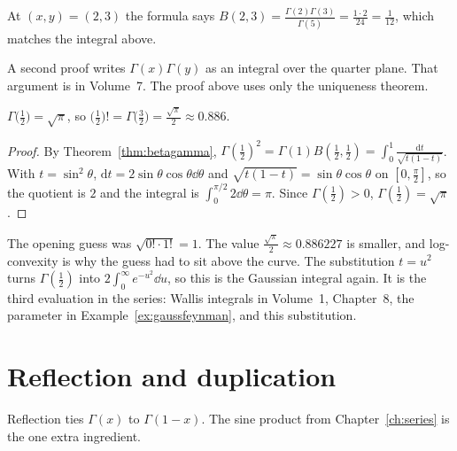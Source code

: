 At $(x,y)=(2,3)$ the formula says $B(2,3)=\frac{\Gamma(2)\Gamma(3)}{\Gamma(5)}=\frac{1\cdot2}{24}=\frac1{12}$, which matches the integral above.

\begin{remark}
A second proof writes $\Gamma(x)\Gamma(y)$ as an integral over the quarter plane. That argument is in Volume~7. The proof above uses only the uniqueness theorem.
\end{remark}

\begin{proposition}\label{prop:gammahalf}
$\Gamma\bigl(\frac12\bigr)=\sqrt\pi$, so $\bigl(\frac12\bigr)!=\Gamma\bigl(\frac32\bigr)=\frac{\sqrt\pi}2\approx0.886$.
\end{proposition}
\begin{proof}
By Theorem~\ref{thm:betagamma}, $\Gamma(\frac12)^2=\Gamma(1)B(\frac12,\frac12)=\int_0^1\frac{\mathrm dt}{\sqrt{t(1-t)}}$. With $t=\sin^2\theta$,
$\mathrm dt=2\sin\theta\cos\theta\dd\theta$ and $\sqrt{t(1-t)}=\sin\theta\cos\theta$ on $[0,\frac\pi2]$, so the quotient is $2$ and the integral is $\int_0^{\pi/2}2\dd\theta=\pi$. Since $\Gamma(\frac12)>0$, $\Gamma(\frac12)=\sqrt\pi$.
\end{proof}

The opening guess was $\sqrt{0!\cdot1!}=1$. The value $\frac{\sqrt\pi}2\approx0.886227$ is smaller, and log-convexity is why the guess had to sit above the curve. The substitution $t=u^2$ turns $\Gamma(\frac12)$ into $2\int_0^\infty e^{-u^2}\dd u$, so this is the Gaussian integral again. It is the third evaluation in the series: Wallis integrals in Volume~1, Chapter~8, the parameter in Example~\ref{ex:gaussfeynman}, and this substitution.

\section{Reflection and duplication}

Reflection ties $\Gamma(x)$ to $\Gamma(1-x)$. The sine product from Chapter~\ref{ch:series} is the one extra ingredient.


